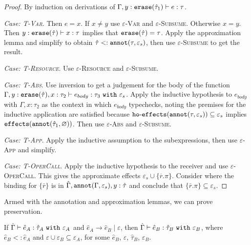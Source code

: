 \begin{proof}
By induction on derivations of $\Gamma, y: \mathtt{erase}(\hat \tau_1) \vdash e: \tau$.

\textit{Case: \textsc{T-Var}}. Then $e = x$. If $x \neq y$ use
\textsc{$\varepsilon$-Var} and \textsc{$\varepsilon$-Subsume}. Otherwise $x = y$.
Then $y: \mathtt{erase}(\hat \tau) \vdash x: \tau$ implies that $\mathtt{erase}(\hat \tau) = \tau$.
Apply the approximation lemma and simplify to obtain $\hat \tau <:
\mathtt{annot}(\tau, \varepsilon_s)$, then use \textsc{$\varepsilon$-Subsume} to get the
result.

\textit{Case: \textsc{T-Resource}}. Use \textsc{$\varepsilon$-Resource} and
\textsc{$\varepsilon$-Subsume}.

\textit{Case: \textsc{T-Abs}}. Use inversion to get a judgement for the body of the
function $\Gamma, y: \mathtt{erase}(\hat \tau), x: \tau_2 \vdash e_{body}: \tau_3
~\mathtt{with}~ \varepsilon_s$. Apply the inductive hypothesis to $e_{body}$ with
$\Gamma, x: \tau_2$ as the context in which $e_{body}$ typechecks, noting the
premises for the inductive application are satisfied because
$\mathtt{ho \hbox{-} effects}(\mathtt{annot}(\tau, \varepsilon_s)) \subseteq \varepsilon_s$ implies
$\mathtt{effects}(\mathtt{annot}(\hat \tau_1, \varnothing))$. Then use \textsc{$\varepsilon$-Abs} and
\textsc{$\varepsilon$-Subsume}.

\textit{Case: \textsc{T-App}}. Apply the inductive assumption to the subexpressions,
then use \textsc{$\varepsilon$-App} and simplify.

\textit{Case: \textsc{T-OperCall}}. Apply the inductive hypothesis to the receiver and
use \textsc{$\varepsilon$-OperCall}. This gives the approximate effects $\varepsilon_s
\cup \{ \overline{r}.\pi \}$. Consider where the binding for $\{ \bar r \}$ is in
$\hat \Gamma, \mathtt{annot}(\Gamma, \varepsilon_s), y: \hat \tau$ and conclude that
$\{ \bar r.\pi \} \subseteq \varepsilon_s$.
\end{proof}

Armed with the annotation and approximation lemmas, we can prove preservation.

\begin{theorem}
If $\hat \Gamma \vdash \hat e_A: \hat \tau_A~\mathtt{with}~ \varepsilon_A$ and
$\hat e_A \longrightarrow \hat e_B \mid \varepsilon$, then $\hat \Gamma \vdash
\hat e_B: \hat \tau_B~\mathtt{with}~ \varepsilon_B$, where $\hat e_B <: \hat e_A$
and $\varepsilon \cup \varepsilon_B \subseteq \varepsilon_A$, for some $\hat e_B$,
$\varepsilon$, $\hat \tau_B$, $\varepsilon_B$.
\end{theorem}

